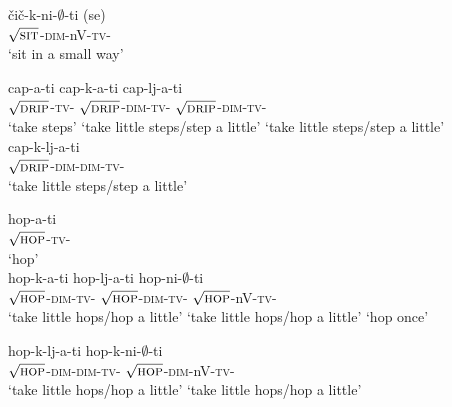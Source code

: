 \documentclass[output=paper,colorlinks,citecolor=brown]{langscibook}
\begin{document}
\ex \gll čič-k-ni-$∅$-ti (se)\\
$\sqrt{\textsc{sit}}$-\textsc{dim}-nV-\textsc{tv}-{\INF} {\REFL}\\
\glt `sit in a small way' \label{str:ex:chld-b}


\z

\ex\label{str:ex:chld1}
\ea \gll cap-a-ti	cap-k-a-ti	cap-lj-a-ti\\
$\sqrt{\textsc{drip}}$-\textsc{tv}-{\INF} $\sqrt{\textsc{drip}}$-\textsc{dim-tv}-{\INF} $\sqrt{\textsc{drip}}$-\textsc{dim-tv}-{\INF}\\ 
\glt `take steps' `take little steps/step a little' `take little steps/step a little' \label{str:ex:chld1-a}\\

\ex \gll cap-k-lj-a-ti\\
$\sqrt{\textsc{drip}}$-\textsc{dim-dim}-\textsc{tv}-{\INF}\\
\glt `take little steps/step a little' \label{str:ex:chld1-b}


\z

\ex\label{str:ex:chld2}
\ea \gll hop-a-ti\\
$\sqrt{\textsc{hop}}$-\textsc{tv}-{\INF} \\ 
\glt `hop'\\

\gll hop-k-a-ti hop-lj-a-ti hop-ni-$∅$-ti\\
$\sqrt{\textsc{hop}}$-\textsc{dim}-\textsc{tv}-{\INF} $\sqrt{\textsc{hop}}$-\textsc{dim}-\textsc{tv}-{\INF} $\sqrt{\textsc{hop}}$-nV-\textsc{tv}-{\INF}\\
\glt `take little hops/hop a little' `take little hops/hop a little' `hop once' \label{str:ex:chld2-a}

\ex \gll hop-k-lj-a-ti hop-k-ni-$∅$-ti\\
$\sqrt{\textsc{hop}}$-\textsc{dim}-\textsc{dim}-\textsc{tv}-{\INF} $\sqrt{\textsc{hop}}$-\textsc{dim}-nV-\textsc{tv}-{\INF}\\
\glt `take little hops/hop a little' `take little hops/hop a little' \label{str:ex:chld2-b}
\end{document}
